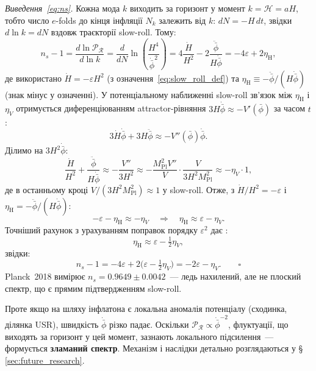 \documentclass[12pt, a4paper]{article}
\begin{document}
\textit{Виведення~\eqref{eq:ns}.}
Кожна мода $k$ виходить за горизонт у момент $k = \mathcal{H}
= aH$, тобто число $e$-folds до кінця інфляції $N_k$ залежить
від $k$: $dN = -H\,dt$, звідки $d\ln k = dN$ вздовж траєкторії
slow-roll. Тому:
\begin{equation*}
  n_s - 1
    = \frac{d\ln\mathcal{P}_{\mathcal{R}}}{d\ln k}
    = \frac{d}{dN}\ln\!\left(\frac{H^4}{\dot{\bar\phi}^2}\right)
    = 4\frac{\dot H}{H^2} - 2\frac{\ddot{\bar\phi}}{H\dot{\bar\phi}}
    = -4\varepsilon + 2\eta_\mathrm{H},
\end{equation*}
де використано $\dot H = -\varepsilon H^2$ (з означення~\eqref{eq:slow_roll_def})
та $\eta_\mathrm{H} \equiv -\ddot{\bar\phi}/(H\dot{\bar\phi})$
(знак мінус у означенні).
У потенціальному наближенні slow-roll зв'язок між $\eta_\mathrm{H}$
і $\eta_V$ отримується диференціюванням attractor-рівняння
$3H\dot{\bar\phi} \approx -V'(\bar\phi)$ за часом $t$:
\begin{equation*}
  3\dot H\dot{\bar\phi} + 3H\ddot{\bar\phi} \approx -V''(\bar\phi)\dot{\bar\phi}.
\end{equation*}
Ділимо на $3H^2\dot{\bar\phi}$:
\begin{equation*}
  \frac{\dot H}{H^2} + \frac{\ddot{\bar\phi}}{H\dot{\bar\phi}}
  \approx -\frac{V''}{3H^2}
  \approx -\frac{M_\mathrm{Pl}^2 V''}{V} \cdot \frac{V}{3H^2 M_\mathrm{Pl}^2}
  \approx -\eta_V \cdot 1,
\end{equation*}
де в останньому кроці $V/(3H^2 M_\mathrm{Pl}^2) \approx 1$ у slow-roll.
Отже, з $\dot H/H^2 = -\varepsilon$ і $\eta_\mathrm{H} = -\ddot{\bar\phi}/(H\dot{\bar\phi})$:
\begin{equation*}
  -\varepsilon - \eta_\mathrm{H} \approx -\eta_V
  \quad\Rightarrow\quad
  \eta_\mathrm{H} \approx \varepsilon - \eta_V.
\end{equation*}
Точніший рахунок з урахуванням поправок порядку $\varepsilon^2$
дає \cite{mukhanov_2005}:
\[
  \eta_\mathrm{H} \approx \varepsilon - \tfrac{1}{2}\eta_V,
\]
звідки:
\begin{equation*}
  n_s - 1 = -4\varepsilon + 2\bigl(\varepsilon -
  \tfrac{1}{2}\eta_V\bigr) = -2\varepsilon - \eta_V. \qquad\square
\end{equation*}
Planck~2018 вимірює $n_s = 0.9649 \pm 0.0042$~--- ледь нахилений,
але не плоский спектр, що є прямим підтвердженням slow-roll.

Проте якщо на шляху інфлатона є локальна аномалія потенціалу
(сходинка, ділянка USR), швидкість $\dot{\bar\phi}$ різко падає.
Оскільки $\mathcal{P}_{\mathcal{R}} \propto \dot{\bar\phi}^{-2}$,
флуктуації, що виходять за горизонт у цей момент, зазнають
локального підсилення~--- формується \textbf{зламаний спектр}.
Механізм і наслідки детально розглядаються у
§\,\ref{sec:future_research}.
\end{document}

